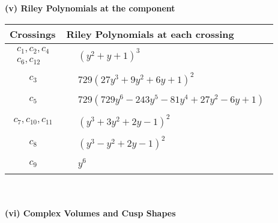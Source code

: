 \documentclass[1p]{elsarticle_modified}
\theoremstyle{definition}
\begin{document}
\newpage\renewcommand{\arraystretch}{1}
\flushleft \textbf{(v) Riley Polynomials at the component}\newline \\
\begin{tabular}{m{50pt}|m{274pt}}
Crossings & \hspace{64pt}Riley Polynomials at each crossing \\
\hline $$\begin{aligned}c_{1},c_{2},c_{4}\\c_{6},c_{12}\end{aligned}$$&$\begin{aligned}
&(y^2+y+1)^3
\end{aligned}$\\
\hline $$\begin{aligned}c_{3}\end{aligned}$$&$\begin{aligned}
&729(27 y^3+9 y^2+6 y+1)^2
\end{aligned}$\\
\hline $$\begin{aligned}c_{5}\end{aligned}$$&$\begin{aligned}
&729(729 y^6-243 y^5-81 y^4+27 y^2-6 y+1)
\end{aligned}$\\
\hline $$\begin{aligned}c_{7},c_{10},c_{11}\end{aligned}$$&$\begin{aligned}
&(y^3+3 y^2+2 y-1)^2
\end{aligned}$\\
\hline $$\begin{aligned}c_{8}\end{aligned}$$&$\begin{aligned}
&(y^3- y^2+2 y-1)^2
\end{aligned}$\\
\hline $$\begin{aligned}c_{9}\end{aligned}$$&$\begin{aligned}
&y^6
\end{aligned}$\\
\hline
\end{tabular}\\~\\
\newpage\flushleft \textbf{(vi) Complex Volumes and Cusp Shapes}
\end{document}
